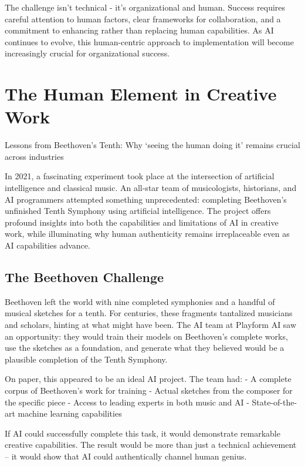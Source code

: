 \documentclass[
  Letterpaper,
]{scrbook}
\begin{document}
The challenge isn't technical - it's organizational and human. Success
requires careful attention to human factors, clear frameworks for
collaboration, and a commitment to enhancing rather than replacing human
capabilities. As AI continues to evolve, this human-centric approach to
implementation will become increasingly crucial for organizational
success.


\chapter{The Human Element in Creative
Work}\label{the-human-element-in-creative-work}

Lessons from Beethoven's Tenth: Why `seeing the human doing it' remains
crucial across industries

\hfill\break

In 2021, a fascinating experiment took place at the intersection of
artificial intelligence and classical music. An all-star team of
musicologists, historians, and AI programmers attempted something
unprecedented: completing Beethoven's unfinished Tenth Symphony using
artificial intelligence. The project offers profound insights into both
the capabilities and limitations of AI in creative work, while
illuminating why human authenticity remains irreplaceable even as AI
capabilities advance.

\section{The Beethoven Challenge}\label{the-beethoven-challenge}

Beethoven left the world with nine completed symphonies and a handful of
musical sketches for a tenth. For centuries, these fragments tantalized
musicians and scholars, hinting at what might have been. The AI team at
Playform AI saw an opportunity: they would train their models on
Beethoven's complete works, use the sketches as a foundation, and
generate what they believed would be a plausible completion of the Tenth
Symphony.

On paper, this appeared to be an ideal AI project. The team had: - A
complete corpus of Beethoven's work for training - Actual sketches from
the composer for the specific piece - Access to leading experts in both
music and AI - State-of-the-art machine learning capabilities

If AI could successfully complete this task, it would demonstrate
remarkable creative capabilities. The result would be more than just a
technical achievement -- it would show that AI could authentically
channel human genius.
\end{document}
